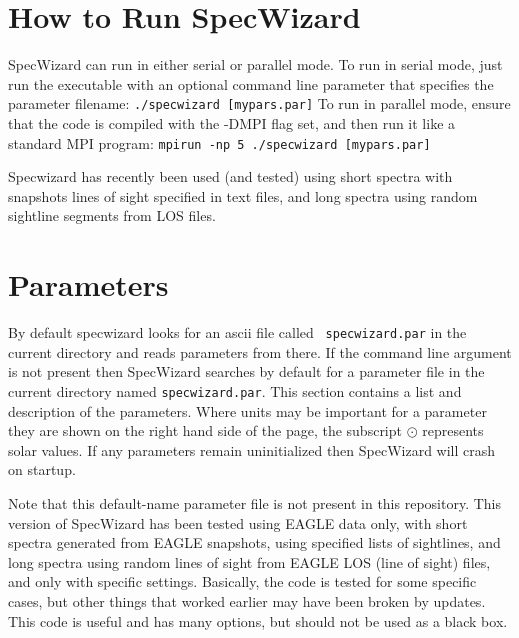 \documentclass{report}
\begin{document}
\chapter{How to Run SpecWizard}

SpecWizard can run in either serial or parallel mode.  To run in serial mode, just run the executable with an optional command line parameter that specifies the parameter filename:
\linebreak\linebreak
{\tt ./specwizard [mypars.par]}
\linebreak\linebreak
To run in parallel mode, ensure that the code is compiled with the -DMPI flag set, and then run it like a standard MPI program:
\linebreak\linebreak
{\tt mpirun -np 5 ./specwizard [mypars.par]}
\linebreak\linebreak

Specwizard has recently been used (and tested) using short spectra with snapshots lines of sight specified in text files, and long spectra using random sightline segments from LOS files. 

\chapter{Parameters}

By default specwizard looks for an ascii file called {\tt
  specwizard.par} in the current directory and reads parameters from
there.  If the command line argument is not present then SpecWizard
searches by default for a parameter file in the current directory
named {\tt specwizard.par}.  This section contains a %
list and description of the parameters.  Where units may be important for a
parameter they are shown on the right hand side of the page, the
subscript ${\odot}$ represents solar values.  If any parameters remain
uninitialized then SpecWizard will crash on startup.  \linebreak

Note that this default-name parameter file is not present in this repository. This version of SpecWizard has been tested using EAGLE data only, with short spectra generated from EAGLE snapshots, using specified lists of sightlines, and long spectra using random lines of sight from EAGLE LOS (line of sight) files, and only with specific settings. Basically, the code is tested for some specific cases, but other things that worked earlier may have been broken by updates. This code is useful and has many options, but should not be used as a black box. 
\end{document}
